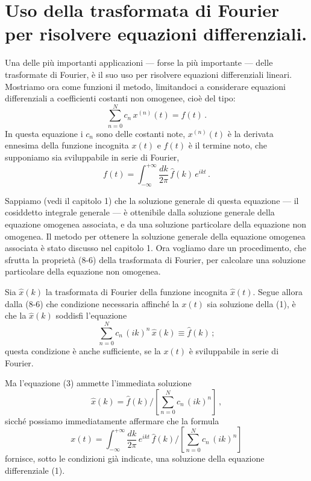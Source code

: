 \documentclass[11pt, a4paper]{book}
\numberwithin{equation}{section}
\begin{document}
\section{Uso della trasformata di Fourier per risolvere equazioni differenziali.}

Una delle più importanti applicazioni --- forse la più importante --- delle trasformate di Fourier, è il suo uso per risolvere equazioni differenziali lineari. Mostriamo ora come funzioni il metodo, limitandoci a considerare equazioni differenziali a coefficienti costanti non omogenee, cioè del tipo:
\begin{equation}
  \sum_{n=0}^{N} c_n\,x^{(n)}(t) = f(t)\,. \tag{1}
\end{equation}
In questa equazione i $c_n$ sono delle costanti note, $x^{(n)}(t)$ è la derivata ennesima della funzione incognita $x(t)$ e $f(t)$ è il termine noto, che supponiamo sia sviluppabile in serie di Fourier,
\begin{equation}
  f(t) = \int_{-\infty}^{+\infty}\frac{dk}{2\pi}\,\hat{f}(k)\,e^{ikt}\,. \tag{2}
\end{equation}

Sappiamo (vedi il capitolo 1) che la soluzione generale di questa equazione --- il cosiddetto integrale generale --- è ottenibile dalla soluzione generale della equazione omogenea associata, e da una soluzione particolare della equazione non omogenea. Il metodo per ottenere la soluzione generale della equazione omogenea associata è stato discusso nel capitolo 1. Ora vogliamo dare un procedimento, che sfrutta la proprietà (8-6) della trasformata di Fourier, per calcolare una soluzione particolare della equazione non omogenea.

Sia $\hat{x}(k)$ la trasformata di Fourier della funzione incognita $\hat{x}(t)$. Segue allora dalla (8-6) che condizione necessaria affinché la $x(t)$ sia soluzione della (1), è che la $\hat{x}(k)$ soddisfi l'equazione
\begin{equation}
  \sum_{n=0}^{N} c_n\,(ik)^n\,\hat{x}(k) \equiv \hat{f}(k)\,; \tag{3}
\end{equation}
questa condizione è anche sufficiente, se la $x(t)$ è sviluppabile in serie di Fourier.

Ma l'equazione (3) ammette l'immediata soluzione
\begin{equation}
  \hat{x}(k) = \hat{f}(k)\Bigg/\left[\sum_{n=0}^{N} c_n\,(ik)^n\right]\,, \tag{4}
\end{equation}
sicché possiamo immediatamente affermare che la formula
\begin{equation}
  x(t) = \int_{-\infty}^{+\infty}\frac{dk}{2\pi}\,e^{ikt}\,\hat{f}(k)\Bigg/
  \left[\sum_{n=0}^{N} c_n\,(ik)^n\right] \tag{5}
\end{equation}
fornisce, sotto le condizioni già indicate, una soluzione della equazione differenziale (1).
\end{document}
